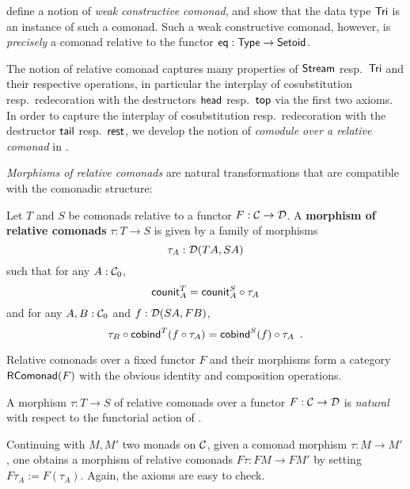 \documentclass{amsart}
\newcommand{\fat}[1]{\textbf{#1}}
\begin{document}
\begin{remark}
 \textcite{DBLP:conf/types/MatthesP11} define a notion of \emph{weak constructive comonad}, and show that the data type $\Tri$
  is an instance of such a comonad. 
  Such a weak constructive comonad, however, is \emph{precisely}
  a comonad relative to the functor $\eq : \Set\to\Setoid$.
\end{remark}


The notion of relative comonad captures many properties of $\stream$ resp.\ $\Tri$ and their respective operations, in particular the interplay
of cosubstitution resp.\ redecoration with the destructors $\shead$ resp.\ $\head$ via the first two axioms.
In order to  capture the interplay 
of cosubstitution resp.\ redecoration with the destructor $\stail$ resp.\ $\tail$,  we develop the notion of \emph{comodule over a relative comonad}
 in . 




\emph{Morphisms of relative comonads} are natural transformations that are compatible with the comonadic structure:

\begin{definition}\label{def:comonad_morphism}
 Let $T$ and $S$ be comonads relative to a functor $F : \C \to \D$. A \fat{morphism of relative comonads} $\tau : T \to S$
  is given by a family of morphisms \[\tau_A : \D(TA,SA)\] such that for any $A : \C_0$,
     \[  \counit^T_A = \comp{\tau_A}{\counit^S_A} \]
   and for any $A,B : \C_0$ and $f : \D(SA,FB)$,
   \[  \comp{\cobind^T(\comp{\tau_A}{f})}{\tau_B} = \comp{\tau_A}{\cobind^S(f)} \enspace .  \]
\end{definition}

Relative comonads over a fixed functor $F$ and their morphisms form a category $\RComonad(F)$ with the obvious identity and composition operations.

\begin{remark}
A morphism $\tau : T\to S$ of relative comonads over a functor $F:\C\to\D$ is  \emph{natural}
with respect to the functorial action of .
\end{remark}

\begin{example}\label{ex_relcom_from_com_morphism}
 Continuing  with $M, M'$ two monads on $\C$, given a comonad morphism $\tau : M \to M'$, one obtains a morphism of 
 relative comonads $F\tau : FM\to FM'$ by setting $F\tau_A := F(\tau_A)$.
 Again, the axioms are easy to check.
\end{example}
\end{document}
